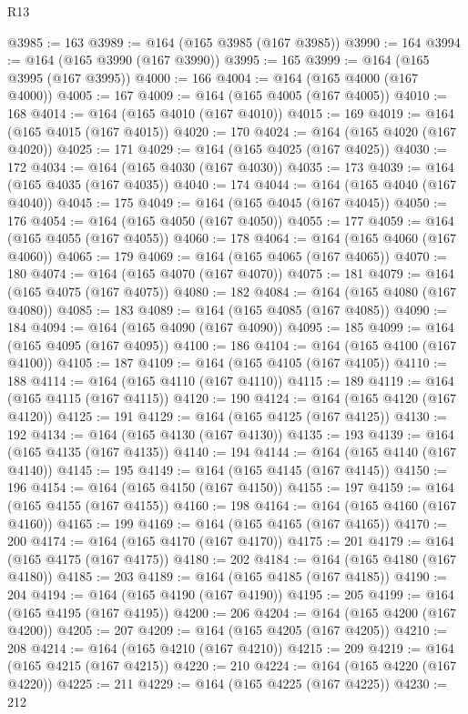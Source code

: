 \begin{lexlean}{R13}
\begin{coremodule}
@3985 := 163
@3989 := @164 (@165 @3985 (@167 @3985))
@3990 := 164
@3994 := @164 (@165 @3990 (@167 @3990))
@3995 := 165
@3999 := @164 (@165 @3995 (@167 @3995))
@4000 := 166
@4004 := @164 (@165 @4000 (@167 @4000))
@4005 := 167
@4009 := @164 (@165 @4005 (@167 @4005))
@4010 := 168
@4014 := @164 (@165 @4010 (@167 @4010))
@4015 := 169
@4019 := @164 (@165 @4015 (@167 @4015))
@4020 := 170
@4024 := @164 (@165 @4020 (@167 @4020))
@4025 := 171
@4029 := @164 (@165 @4025 (@167 @4025))
@4030 := 172
@4034 := @164 (@165 @4030 (@167 @4030))
@4035 := 173
@4039 := @164 (@165 @4035 (@167 @4035))
@4040 := 174
@4044 := @164 (@165 @4040 (@167 @4040))
@4045 := 175
@4049 := @164 (@165 @4045 (@167 @4045))
@4050 := 176
@4054 := @164 (@165 @4050 (@167 @4050))
@4055 := 177
@4059 := @164 (@165 @4055 (@167 @4055))
@4060 := 178
@4064 := @164 (@165 @4060 (@167 @4060))
@4065 := 179
@4069 := @164 (@165 @4065 (@167 @4065))
@4070 := 180
@4074 := @164 (@165 @4070 (@167 @4070))
@4075 := 181
@4079 := @164 (@165 @4075 (@167 @4075))
@4080 := 182
@4084 := @164 (@165 @4080 (@167 @4080))
@4085 := 183
@4089 := @164 (@165 @4085 (@167 @4085))
@4090 := 184
@4094 := @164 (@165 @4090 (@167 @4090))
@4095 := 185
@4099 := @164 (@165 @4095 (@167 @4095))
@4100 := 186
@4104 := @164 (@165 @4100 (@167 @4100))
@4105 := 187
@4109 := @164 (@165 @4105 (@167 @4105))
@4110 := 188
@4114 := @164 (@165 @4110 (@167 @4110))
@4115 := 189
@4119 := @164 (@165 @4115 (@167 @4115))
@4120 := 190
@4124 := @164 (@165 @4120 (@167 @4120))
@4125 := 191
@4129 := @164 (@165 @4125 (@167 @4125))
@4130 := 192
@4134 := @164 (@165 @4130 (@167 @4130))
@4135 := 193
@4139 := @164 (@165 @4135 (@167 @4135))
@4140 := 194
@4144 := @164 (@165 @4140 (@167 @4140))
@4145 := 195
@4149 := @164 (@165 @4145 (@167 @4145))
@4150 := 196
@4154 := @164 (@165 @4150 (@167 @4150))
@4155 := 197
@4159 := @164 (@165 @4155 (@167 @4155))
@4160 := 198
@4164 := @164 (@165 @4160 (@167 @4160))
@4165 := 199
@4169 := @164 (@165 @4165 (@167 @4165))
@4170 := 200
@4174 := @164 (@165 @4170 (@167 @4170))
@4175 := 201
@4179 := @164 (@165 @4175 (@167 @4175))
@4180 := 202
@4184 := @164 (@165 @4180 (@167 @4180))
@4185 := 203
@4189 := @164 (@165 @4185 (@167 @4185))
@4190 := 204
@4194 := @164 (@165 @4190 (@167 @4190))
@4195 := 205
@4199 := @164 (@165 @4195 (@167 @4195))
@4200 := 206
@4204 := @164 (@165 @4200 (@167 @4200))
@4205 := 207
@4209 := @164 (@165 @4205 (@167 @4205))
@4210 := 208
@4214 := @164 (@165 @4210 (@167 @4210))
@4215 := 209
@4219 := @164 (@165 @4215 (@167 @4215))
@4220 := 210
@4224 := @164 (@165 @4220 (@167 @4220))
@4225 := 211
@4229 := @164 (@165 @4225 (@167 @4225))
@4230 := 212

\end{coremodule}
\end{lexlean}

